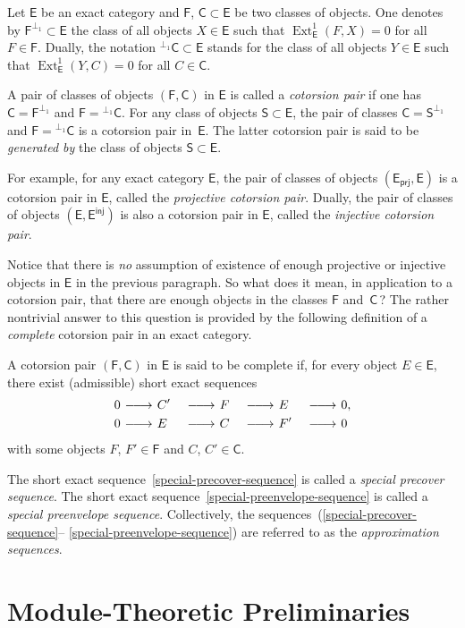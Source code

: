 \documentclass[12pt,a4paper]{amsart}
\newcommand{\+}{\nobreakdash-}
\renewcommand{\:}{\colon}
\newcommand{\lrarrow}{\mskip.5\thinmuskip\relbar\joinrel\relbar
   \joinrel\rightarrow\mskip.5\thinmuskip\relax}
\DeclareMathOperator{\Ext}{Ext}
\newcommand{\prj}{\mathsf{prj}}
\newcommand{\inj}{\mathsf{inj}}
\newcommand{\sE}{\mathsf E}
\newcommand{\sF}{\mathsf F}
\newcommand{\sC}{\mathsf C}
\newcommand{\sS}{\mathsf S}
\newcommand{\Section}[1]{\bigskip\section{#1}\medskip}
\theoremstyle{plain}
\theoremstyle{definition}
\begin{document}
 Let $\sE$ be an exact category and $\sF$, $\sC\subset\sE$ be two
classes of objects.
 One denotes by $\sF^{\perp_1}\subset\sE$ the class of all objects
$X\in\sE$ such that $\Ext^1_\sE(F,X)=0$ for all $F\in\sF$.
 Dually, the notation ${}^{\perp_1}\sC\subset\sE$ stands for the class
of all objects $Y\in\sE$ such that $\Ext^1_\sE(Y,C)=0$ for all
$C\in\sC$.

 A pair of classes of objects $(\sF,\sC)$ in $\sE$ is called
a \emph{cotorsion pair} if one has $\sC=\sF^{\perp_1}$ and
$\sF={}^{\perp_1}\sC$.
 For any class of objects $\sS\subset\sE$, the pair of classes
$\sC=\sS^{\perp_1}$ and $\sF={}^{\perp_1}\sC$ is a cotorsion pair
in~$\sE$.
 The latter cotorsion pair is said to be \emph{generated by}
the class of objects $\sS\subset\sE$.

 For example, for any exact category $\sE$, the pair of classes of
objects $(\sE_\prj,\sE)$ is a cotorsion pair in $\sE$, called
the \emph{projective cotorsion pair}.
 Dually, the pair of classes of objects $(\sE,\sE^\inj)$ is also
a cotorsion pair in $\sE$, called the \emph{injective cotorsion pair}.

 Notice that there is \emph{no} assumption of existence of enough
projective or injective objects in $\sE$ in the previous paragraph.
 So what does it mean, in application to a cotorsion pair, that
there are enough objects in the classes $\sF$ and~$\sC$\,?
 The rather nontrivial answer to this question is provided by
the following definition of a \emph{complete} cotorsion pair in
an exact category.

 A cotorsion pair $(\sF,\sC)$ in $\sE$ is said to be complete if,
for every object $E\in\sE$, there exist (admissible) short exact
sequences
\begin{alignat}{4}
 0&\lrarrow C'&&\lrarrow F&&\lrarrow E&&\lrarrow0,
\label{special-precover-sequence} \\
 0&\lrarrow E&&\lrarrow C&&\lrarrow F'&&\lrarrow0
\label{special-preenvelope-sequence}
\end{alignat}
with some objects $F$, $F'\in\sF$ and $C$, $C'\in\sC$.

 The short exact sequence~\eqref{special-precover-sequence} is called
a \emph{special precover sequence}.
 The short exact sequence~\eqref{special-preenvelope-sequence} is
called a \emph{special preenvelope sequence}.
 Collectively, the sequences~(\ref{special-precover-sequence}\+-%
\ref{special-preenvelope-sequence}) are referred to as
the \emph{approximation sequences}.


\Section{Module-Theoretic Preliminaries}
\end{document}
